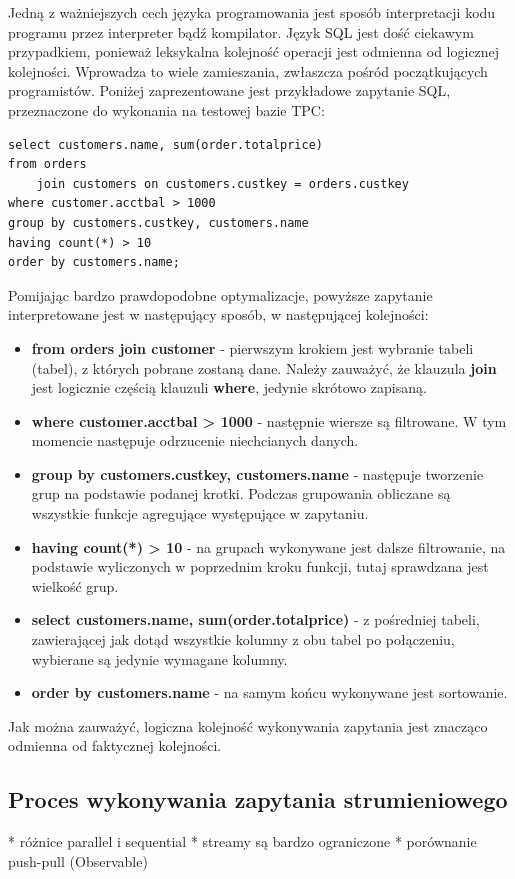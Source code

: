 \documentclass[12pt]{extarticle}
\begin{document}
    Jedną z ważniejszych cech języka programowania jest sposób interpretacji kodu programu przez interpreter bądź kompilator. Język SQL jest dość ciekawym przypadkiem, ponieważ leksykalna kolejność operacji jest odmienna od logicznej kolejności. Wprowadza to wiele zamieszania, zwłaszcza pośród początkujących programistów. Poniżej zaprezentowane jest przykładowe zapytanie SQL, przeznaczone do wykonania na testowej bazie TPC:


\begin{lstlisting}[label=sqlorder, caption=Przykład kolejności wykonywania zapytania SQL]
select customers.name, sum(order.totalprice)
from orders 
    join customers on customers.custkey = orders.custkey
where customer.acctbal > 1000
group by customers.custkey, customers.name
having count(*) > 10
order by customers.name;
\end{lstlisting}

Pomijając bardzo prawdopodobne optymalizacje, powyższe zapytanie interpretowane jest w następujący sposób, w następującej kolejności:

\begin{itemize}
    \item \textbf{from orders join customer} - pierwszym krokiem jest wybranie tabeli (tabel), z których pobrane zostaną dane. Należy zauważyć, że klauzula \textbf{join} jest logicznie częścią klauzuli \textbf{where}, jedynie skrótowo zapisaną.
    \item \textbf{where customer.acctbal > 1000} - następnie wiersze są filtrowane. W tym momencie następuje odrzucenie niechcianych danych. 
    \item \textbf{group by customers.custkey, customers.name} - następuje tworzenie grup na podstawie podanej krotki. Podczas grupowania obliczane są wszystkie funkcje agregujące występujące w zapytaniu.
    \item \textbf{having count(*) > 10} - na grupach wykonywane jest dalsze filtrowanie, na podstawie wyliczonych w poprzednim kroku funkcji, tutaj sprawdzana jest wielkość grup.
    \item \textbf{select customers.name, sum(order.totalprice)} - z pośredniej tabeli, zawierającej jak dotąd wszystkie kolumny z obu tabel po połączeniu, wybierane są jedynie wymagane kolumny.
    \item \textbf{order by customers.name} - na samym końcu wykonywane jest sortowanie.
\end{itemize}

Jak można zauważyć, logiczna kolejność wykonywania zapytania jest znacząco odmienna od faktycznej kolejności.

\subsection{Proces wykonywania zapytania strumieniowego}

* różnice parallel i sequential
* streamy są bardzo ograniczone
* porównanie push-pull (Observable)
\end{document}
